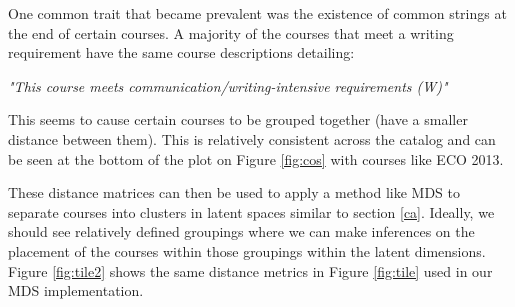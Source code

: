 One common trait that became prevalent was the existence of common strings at the end of certain courses.  A majority of the courses that meet a writing 
requirement have the same course descriptions detailing:

 \textit{"This course meets communication/writing-intensive requirements (W)"} 
 
This seems to cause certain courses to be grouped together (have a smaller distance between them).  This is relatively consistent across the catalog and can 
be seen at the bottom of the plot on Figure \ref{fig:cos} with courses like ECO 2013. 

These distance matrices can then be used to apply a method like MDS to separate courses into clusters in latent spaces similar to section \ref{ca}. Ideally, 
we should see relatively defined groupings where we can make inferences on the placement of the courses within those groupings within the latent dimensions.  
Figure \ref{fig:tile2} shows the same distance metrics in Figure \ref{fig:tile} used in our MDS implementation.

